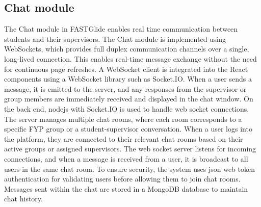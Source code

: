 \documentclass{FastFyp}
\begin{document}
\subsection{Chat module}
The Chat module in FASTGlide enables real time communication between students and their supervisors. The Chat module is implemented using WebSockets, which provides full duplex communication channels over a single, long-lived connection. This enables real-time message exchange without the need for continuous page refreshes. A WebSocket client is integrated into the React components using a WebSocket library such as Socket.IO. When a user sends a message, it is emitted to the server, and any responses from the supervisor or group members are immediately received and displayed in the chat window. On the back end, nodejs with Socket.IO is used to handle web socket connections. The server manages multiple chat rooms, where each room corresponds to a specific FYP group or a student-supervisor conversation. When a user logs into the platform, they are connected to their relevant chat rooms based on their active groups or assigned supervisors. The web socket server listens for incoming connections, and when a message is received from a user, it is broadcast to all users in the same chat room. To ensure security, the system uses json web  token authentication for validating users before allowing them to join chat rooms. Messages sent within the chat are stored in a MongoDB database to maintain chat history.
\end{document}
